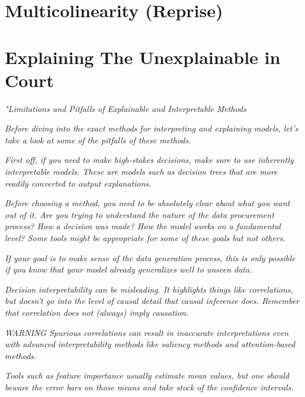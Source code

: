 \section{Multicolinearity (Reprise)}


\section{Explaining The Unexplainable in Court}

\textit{"Limitations and Pitfalls of Explainable and Interpretable Methods}

\textit{Before diving into the exact methods for interpreting and explaining models, let's take a look at some of the pitfalls of these methods.}

\textit{First off, if you need to make high-stakes decisions, make sure to use inherently interpretable models. These are models such as decision trees that are more readily converted to output explanations.}

\textit{Before choosing a method, you need to be absolutely clear about what you want out of it. Are you trying to understand the nature of the data procurement process? How a decision was made? How the model works on a fundamental level? Some tools might be appropriate for some of these goals but not others.}

\textit{If your goal is to make sense of the data generation process, this is only possible if you know that your model already generalizes well to unseen data.}

\textit{Decision interpretability can be misleading. It highlights things like correlations, but doesn’t go into the level of causal detail that causal inference does. Remember that correlation does not (always) imply causation.}

\textit{WARNING}
\textit{Spurious correlations can result in inaccurate interpretations even with advanced interpretability methods like saliency methods and attention-based methods.}

\textit{Tools such as feature importance usually estimate mean values, but one should beware the error bars on those means and take stock of the confidence intervals.}

